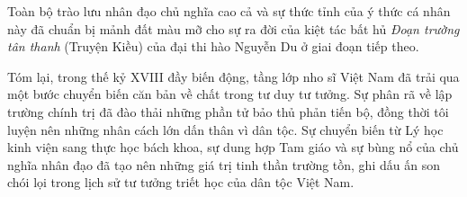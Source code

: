 Toàn bộ trào lưu nhân đạo chủ nghĩa cao cả và sự thức tỉnh của ý thức cá nhân này đã chuẩn bị mảnh đất màu mỡ cho sự ra đời của kiệt tác bất hủ \textit{Đoạn trường tân thanh} (Truyện Kiều) của đại thi hào Nguyễn Du ở giai đoạn tiếp theo.

Tóm lại, trong thế kỷ XVIII đầy biến động, tầng lớp nho sĩ Việt Nam đã trải qua một bước chuyển biến căn bản về chất trong tư duy tư tưởng. Sự phân rã về lập trường chính trị đã đào thải những phần tử bảo thủ phản tiến bộ, đồng thời tôi luyện nên những nhân cách lớn dấn thân vì dân tộc. Sự chuyển biến từ Lý học kinh viện sang thực học bách khoa, sự dung hợp Tam giáo và sự bùng nổ của chủ nghĩa nhân đạo đã tạo nên những giá trị tinh thần trường tồn, ghi dấu ấn son chói lọi trong lịch sử tư tưởng triết học của dân tộc Việt Nam.

